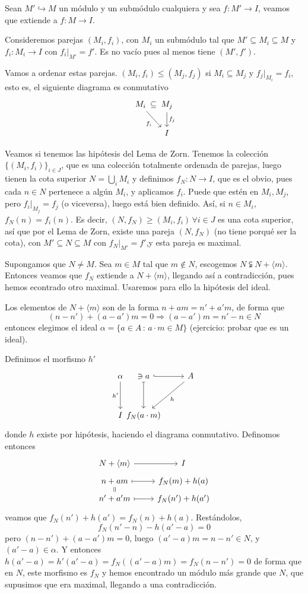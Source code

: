 \begin{dem}
    Sean $M'\hookrightarrow M$ un m\'odulo y un subm\'odulo cualquiera y sea $f: M' \longrightarrow I$, veamos que extiende a $f: M \longrightarrow I$. 

    Consideremos parejas $(M_i, f_i)$, con $M_i$ un subm\'odulo tal que $M ' \subseteq M_i \subseteq M$ y $f_i : M_i \longrightarrow I$ con $f_i|_{M'} = f'$. Es no vac\'io pues al menos tiene $(M', f')$. 
    
    Vamos a ordenar estas parejas. $(M_i,f_i) \leq (M_j,f_j)$ si $M_i \subseteq M_j$ y $f_j|_{M_i} = f_i$, esto es, el siguiente diagrama es conmutativo
    $$\bt M_i \arrow[swap]{dr}{f_i} \arrow[r, phantom, "\subseteq"] &[-5mm] M_j \arrow{d}{f_j} \\ &[-5mm] I \et$$

    Veamos si tenemos las hip\'otesis del Lema de Zorn. Tenemos la colecci\'on $\{(M_i,f_i)\}_{i \in J}$, que es una colecci\'on totalmente ordenada de parejas, luego tienen la cota superior $N = \bigcup_i M_i$ y definimos $f_N : N \longrightarrow I$, que es el obvio, pues cada $n\in N$ pertenece a alg\'un $M_i$, y aplicamos $f_i$. Puede que est\'en en $M_i, M_j$, pero $f_i|_{M_j} = f_j$ (o viceversa), luego est\'a bien definido. As\'i, si $n \in M_i$, $f_N(n) = f_i(n)$. Es decir, $(N,f_N) \geq (M_i,f_i) \, \forall i \in J$ es una cota superior, as\'i que por el Lema de Zorn, existe una pareja $(N, f_N)$ (no tiene porqu\'e ser la cota), con $M' \subseteq N \subseteq M$ con $f_N|_{M'} = f'$,y esta pareja es maximal. 

    Supongamos que $N\neq M$. Sea $m \in M$ tal que $m \nin N$, escogemos $N\subsetneqq N +\langle m\rangle$. Entonces veamos que $f_N$ extiende a $N+\langle m\rangle$, llegando as\'i a contradicci\'on, pues hemos econtrado otro maximal. Usaremos para ello la hip\'otesis del ideal. 

    Los elementos de $N+\langle m \rangle$ son de la forma $n + am = n'+a'm$, de forma que $$(n-n') + (a-a')m = 0 \Rightarrow (a-a')m=n'-n \in N$$
    entonces elegimos el ideal $\alpha = \{a\in A\, : \, a\cdot m \in M \}$ (ejercicio: probar que es un ideal). 



Definimos el morfismo $h'$
$$\bt \alpha  \arrow[swap]{d}{h'} &[-10mm] \ni a \arrow[mapsto]{d} \arrow[hook]{r} & A \arrow{dl}{h} \\[5mm] I &[-10mm] f_N(a\cdot m)  \et$$
donde $h$ existe por hip\'otesis, haciendo el diagrama conmutativo. Definomos entonces 
$$\bt N + \langle m \rangle \rar & I \\[-5mm] n+am\arrow[equal]{d} \rarmaps & f_N(m) + h(a) 
\\[-5mm] n'+a'm \rarmaps & f_N(n') + h(a') \et$$
veamos que $f_N(n') + h(a') = f_N(n) + h(a)$. Rest\'andolos, 
$$f_N(n'-n) - h(a'-a) = 0 $$
pero $(n-n') + (a-a')m=0$, luego $(a'-a)m=n-n' \in N$, y $(a'-a) \in \alpha$. Y entonces $h(a'-a) = h'(a'-a) = f_N((a'-a)m) = f_N(n-n') = 0$ de forma que en $N$, este morfismo es $f_N$ y hemos encontrado un m\'odulo m\'as grande que $N$, que supusimos que era maximal, llegando a una contradicci\'on.
\end{dem}

